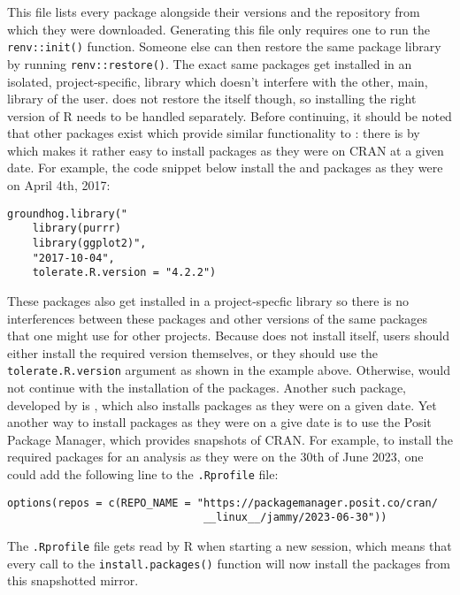 \documentclass[
  article]{jss}
\begin{document}
This file lists every package alongside their versions and the
repository from which they were downloaded. Generating this file only
requires one to run the \texttt{renv::init()} function. Someone else can
then restore the same package library by running
\texttt{renv::restore()}. The exact same packages get installed in an
isolated, project-specific, library which doesn't interfere with the
other, main, library of the user.  does not restore the
 itself though, so installing the right version of R needs
to be handled separately. Before continuing, it should be noted that
other packages exist which provide similar functionality to :
there is  by \citet{simonsohn2023} which makes it rather
easy to install packages as they were on CRAN at a given date. For
example, the code snippet below install the  and
 packages as they were on April 4th, 2017:

\begin{verbatim}
groundhog.library("
    library(purrr)
    library(ggplot2)",
    "2017-10-04",
    tolerate.R.version = "4.2.2")
\end{verbatim}

These packages also get installed in a project-specfic library so there
is no interferences between these packages and other versions of the
same packages that one might use for other projects. Because
 does not install  itself, users should
either install the required version themselves, or they should use the
\texttt{tolerate.R.version} argument as shown in the example above.
Otherwise,  would not continue with the installation of
the packages. Another such package, developed by \citet{chan2023} is
, which also installs packages as they were on a given date.
Yet another way to install packages as they were on a give date is to
use the Posit Package Manager, which provides snapshots of CRAN. For
example, to install the required packages for an analysis as they were
on the 30th of June 2023, one could add the following line to the
\texttt{.Rprofile} file:

\begin{verbatim}
options(repos = c(REPO_NAME = "https://packagemanager.posit.co/cran/
                               __linux__/jammy/2023-06-30"))
\end{verbatim}

The \texttt{.Rprofile} file gets read by R when starting a new session,
which means that every call to the \texttt{install.packages()} function
will now install the packages from this snapshotted mirror.
\end{document}
